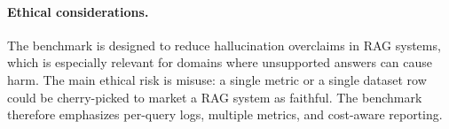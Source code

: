 \paragraph{Ethical considerations.}
The benchmark is designed to reduce hallucination overclaims in RAG systems,
which is especially relevant for domains where unsupported answers can cause
harm. The main ethical risk is misuse: a single metric or a single dataset row
could be cherry-picked to market a RAG system as faithful. The benchmark
therefore emphasizes per-query logs, multiple metrics, and cost-aware reporting.
